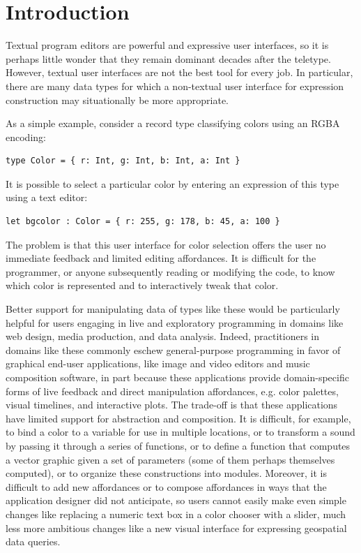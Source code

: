 \section{Introduction}\label{sec:intro}
Textual program editors are powerful and expressive user interfaces,
so it is perhaps little wonder that they remain dominant decades after the teletype.
However, textual user interfaces are not the best tool for every job.
In particular, there are many
data types for which a non-textual
user interface for expression construction may situationally be more appropriate.

As a simple example, consider a record type
classifying colors using an RGBA encoding:
\begin{lstlisting}[numbers=none]
type Color = { r: Int, g: Int, b: Int, a: Int }
\end{lstlisting}
It is possible to select a particular color by entering
an expression of this type using a text editor:
\begin{lstlisting}[numbers=none]
let bgcolor : Color = { r: 255, g: 178, b: 45, a: 100 }
\end{lstlisting}
The problem is that this user interface for color selection
offers the user no immediate feedback
and limited editing affordances.
It is difficult for the programmer, or anyone subsequently reading or modifying the code, to know which color is represented
and to interactively tweak that color.

Better support for manipulating data of types like these would be particularly helpful for users engaging in
live and exploratory programming in domains like web design, media production,
and data analysis. Indeed, practitioners in domains like these commonly eschew general-purpose programming
in favor of graphical end-user applications, like %
image and video editors and music composition software,
in part because these applications provide domain-specific forms of live feedback and
direct manipulation affordances, e.g. color palettes, visual timelines, and interactive plots.
The trade-off is that these applications have limited support for abstraction and composition.
It is difficult, for example, to bind a
color to a variable for use in multiple locations,
or to transform a sound by passing it through a series of functions,
or to define a function that computes a vector graphic given a set
of parameters (some of them perhaps themselves computed),
or to organize these constructions into modules.
Moreover, it is difficult to add new affordances or to compose
affordances in ways that the application designer did not anticipate,
so users cannot easily make even simple changes like replacing a numeric text box in a color chooser with a slider,
much less more ambitious changes like a new visual interface for expressing geospatial data queries.

